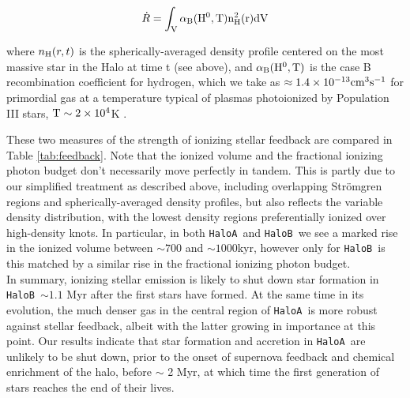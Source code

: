 \documentclass[graphics, twocolumn, usenatbib]{mn2e}
\newcommand{\ha} {\texttt{HaloA~}}
\newcommand{\hb} {\texttt{HaloB~}}
\begin{document}
\begin{equation}
    \dot R = \int_{\rm{V}}\alpha_{\rm{B}}(\rm{H}^{0},T)n_{\rm{H}}^{2}(r)d\rm{V}
\end{equation}

\noindent where $n_{\rm{H}}(r, t)$ is the spherically-averaged density profile centered on the most massive star in the Halo at time t (see above), and $\alpha_{\rm{B}}(\rm{H}^{0},T)$ is the case B recombination coefficient for hydrogen, which we take as $\approx1.4\times 10^{-13}\rm{cm}^{3}\rm{s}^{-1}$ for primordial gas at a temperature typical of plasmas photoionized by Population III stars, $\rm{T}\sim 2\times 10^{4}$K \citep{Osterbrock2006, Johnson2012}. 

These two measures of the strength of ionizing stellar feedback are compared in Table \ref{tab:feedback}. Note that the ionized volume and the fractional ionizing photon budget don't necessarily move perfectly in tandem. This is partly due to our simplified treatment as described above, including overlapping Str{\" o}mgren regions and spherically-averaged density profiles, but also reflects the variable density distribution, with the lowest density regions preferentially ionized over high-density knots. In particular, in both \ha and \hb we see a marked rise in the ionized volume between $\sim 700$ and $\sim1000$kyr, however only for \hb is this matched by a similar rise in the fractional ionizing photon budget. \\
\indent In summary, ionizing stellar emission is likely to shut down star formation in \hb $\sim 1.1$ Myr after the first stars have formed. At the same time in its evolution, the much denser gas in the central region of \ha is more robust against stellar feedback, albeit with the latter growing in importance at this point. Our results indicate that star formation and accretion in \ha are unlikely to be shut down, prior to the onset of supernova feedback and chemical enrichment of the halo, before $\sim$ 2 Myr, at which time the first generation of stars reaches the end of their lives. 

 
\end{document}
